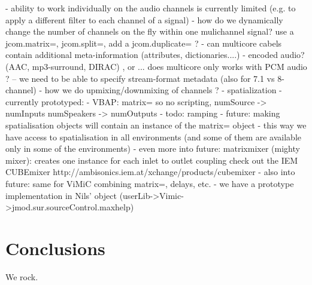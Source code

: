 \documentclass[twoside,a4paper]{article}
\begin{document}
- ability to work individually on the audio channels is currently limited (e.g. to apply a different filter to each channel of a signal)
- how do we dynamically change the number of channels on the fly within one mulichannel signal? use a jcom.matrix=, jcom.split=, add a jcom.duplicate= ? 
- can multicore cabels contain additional meta-information (attributes, dictionaries....)
- encoded audio? (AAC, mp3-surround, DIRAC) , or ... does multicore only works with PCM audio ? -- we need to be able to specify stream-format metadata (also for 7.1 vs 8-channel)
- how we do upmixing/downmixing of channels ? 
    - spatialization - currently prototyped:
        - VBAP: matrix= so no scripting, 
            numSource -> numInputs
            numSpeakers -> numOutputs
        - todo: ramping
        - future: making spatialisation objects will contain an instance of the matrix= object
        - this way we have access to spatialisation in all environments
            (and some of them are available only in some of the environments)
        - even more into future: matrixmixer (mighty mixer): creates one instance for each inlet to outlet coupling
                                    check out the IEM CUBEmixer  http://ambisonics.iem.at/xchange/products/cubemixer
        - also into future: same for ViMiC combining matrix=, delays, etc.
        - we have a prototype implementation in Nils' object (userLib->Vimic->jmod.sur.sourceControl.maxhelp)





%
\section{Conclusions} %
%

We rock.







%
%

\end{document}
